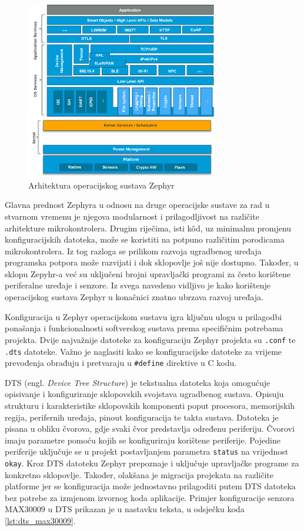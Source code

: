 \documentclass[../diplomski_rad.tex]{subfiles}
\begin{document}
\begin{figure}[htb]
    \centering
    \includegraphics[width=0.75\textwidth]{Figures/zephyr.png} 
    \caption{Arhitektura operacijskog sustava Zephyr \cite{zephyr}}
    \label{slk:zephyr}
\end{figure}

Glavna prednost Zephyra u odnosu na druge operacijske sustave za rad u stvarnom vremenu je njegova 
modularnost i prilagodljivost na različite arhitekture mikrokontrolera. 
Drugim riječima, isti k\^{o}d, uz minimalnu promjenu konfiguracijskih datoteka, može se koristiti na potpuno 
različitim porodicama mikrokontrolera. Iz tog razloga se prilikom razvoja ugradbenog uređaja programska 
potpora može razvijati i dok sklopovlje još nije dostupno.
Također, u sklopu Zepyhr-a već su uključeni brojni upravljački programi za često korištene periferalne 
uređaje i senzore. 
Iz svega navedeno vidljivo je kako korištenje operacijskog sustava Zephyr u konačnici 
znatno ubrzava razvoj uređaja.

Konfiguracija u Zephyr operacijskom sustavu igra ključnu ulogu u prilagodbi ponašanja i funkcionalnosti 
softverskog sustava prema specifičnim potrebama projekta.
Dvije najvažnije datoteke za konfiguraciju Zephyr projekta su \texttt{.conf} te \texttt{.dts} datoteke. 
Važno je naglasiti kako se konfiguracijske datoteke za vrijeme prevođenja obrađuju i pretvaraju u 
\texttt{\#define} direktive u C kodu. 

DTS (engl. \textit{Device Tree Structure}) je tekstualna datoteka koja
omogućuje opisivanje i konfiguriranje sklopovskih svojstava ugradbenog sustava.
Opisuju strukturu i karakteristike sklopovskih komponenti poput procesora, 
memorijskih regija, perifernih uređaja, pinout konfiguracija te takta sustava.
Datoteka je pisana u obliku čvorova, gdje svaki čvor predstavlja određenu periferiju. 
Čvorovi imaju parametre pomoću kojih se konfiguriraju korištene periferije.  
Pojedine periferije uključuje se u projekt postavljanjem parametra \texttt{status} na vrijednost \texttt{okay}.
Kroz DTS datoteku Zephyr prepoznaje i uključuje upravljačke programe za konkretno sklopovlje. 
Također, olakšana je migracija projekata na različite platforme jer se konfiguracija može jednostavno 
prilagoditi putem DTS datoteka bez potrebe za izmjenom izvornog koda aplikacije.
Primjer konfiguracije senzora MAX30009 u DTS prikazan je u nastavku teksta, u odsječku koda \ref{lst:dts_max30009}. 
\end{document}
